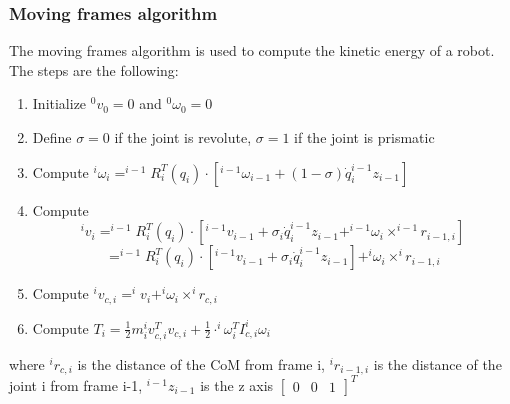 \documentclass[a4paper,12pt]{article}
\begin{document}
\subsubsection{Moving frames algorithm}
The moving frames algorithm is used to compute the kinetic energy of a robot.
The steps are the following:
\begin{enumerate}
    \item Initialize $^0v_0 = 0$ and $^0\omega_0 = 0$
    \item Define $\sigma = 0$ if the joint is revolute, $\sigma = 1$ if the joint is prismatic
    \item Compute $^i\omega_i = ^{i-1}R_i^T(q_i) \cdot[^{i-1}\omega_{i-1} + (1-\sigma)\dot{q}_i ^{i-1}z_{i-1}]$
    \item Compute \begin{equation} 
        ^i v_i = ^{i-1}R_i^T(q_i) \cdot[^{i-1}v_{i-1} + \sigma_i\dot{q}_i ^{i-1}z_{i-1} + ^{i-1}\omega_i \times ^{i-1}r_{i-1,i}]
    \end{equation}
    \begin{equation}
    =^{i-1}R_i^T(q_i) \cdot[^{i-1}v_{i-1} + \sigma_i\dot{q}_i ^{i-1}z_{i-1}] + ^i\omega_i \times ^ir_{i-1,i} 
\end{equation}
    \item Compute $^i v_{c,i} = ^i v_i + ^i\omega_i \times ^i r_{c,i}$
    \item Compute $T_i = \frac{1}{2} m_i ^i v_{c,i}^{T}v_{c,i} + \frac{1}{2}\cdot ^i\omega_i^T I_{c,i} ^i\omega_i$
\end{enumerate}
where $^i r_{c,i}$ is the distance of the CoM from frame i,
$^i r_{i-1,i}$ is the distance of the joint i from frame i-1,
$^{i-1}z_{i-1}$ is the z axis $\begin{bmatrix} 0 & 0 & 1 \end{bmatrix}^T$
\end{document}
